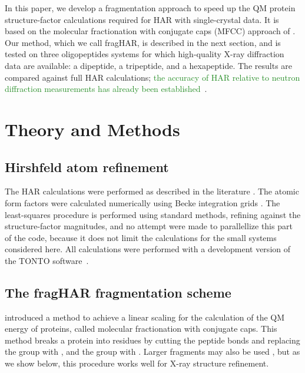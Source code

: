 \documentclass[preprint,dvipsnames]{iucr}              %
\newcommand{\changed}[1]{\textcolor{ForestGreen}{#1}}
\begin{document}
In this paper, we develop a fragmentation approach to
speed up the QM protein structure-factor calculations 
required for HAR with single-crystal data. 
It is based on the molecular fractionation
with conjugate caps (MFCC) approach of .
Our method, which we call fragHAR,
is described in the next section, and is tested on three oligopeptides 
systems for which high-quality X-ray diffraction data are 
available: a dipeptide, a tripeptide, and a hexapeptide. 
The results are compared against full HAR calculations;
\changed{the accuracy of HAR relative to neutron diffraction 
measurements has already been
established~\cite{capelli2014hirshfeld,fugel2018probing}}.


\section{Theory and Methods}

\subsection{Hirshfeld atom refinement }

The HAR calculations were performed as described in the literature \cite{jayatilaka2008x,%
capelli2014hirshfeld,woinska2014hirshfeld}.
The atomic form factors were calculated numerically using Becke integration grids \cite{becke1988multicenter}.
The least-squares procedure is performed using
standard methods, refining against the structure-factor magnitudes,
and no attempt were made to parallellize this part of the code, because it does not limit the calculations for the small systems considered here. 
All calculations were performed with a development version of the TONTO software~\cite{tonto}.



\subsection{The fragHAR fragmentation scheme}
\label{sec_frag}

 introduced a method to achieve 
a linear scaling for the calculation of the QM energy of proteins,
called molecular fractionation with conjugate caps.
This method breaks a protein into residues by cutting the 
peptide bonds and replacing the  group with ,
and the  group with . Larger fragments 
may also be used \cite{grimme:12}, but as we show below, 
this procedure works well for X-ray structure refinement.
\end{document}
